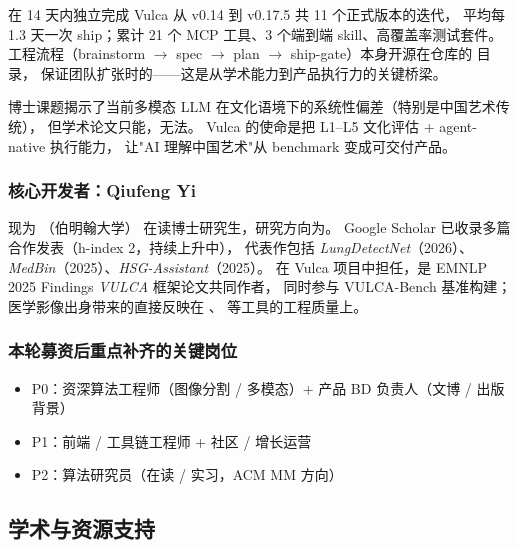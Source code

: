 \quad 在 14 天内独立完成 Vulca 从 v0.14 到 v0.17.5 共 11 个正式版本的迭代，
平均每 1.3 天一次 ship；累计 21 个 MCP 工具、3 个端到端 skill、高覆盖率测试套件。
工程流程（brainstorm $\to$ spec $\to$ plan $\to$ ship-gate）本身开源在仓库的  目录，
保证团队扩张时的——这是从学术能力到产品执行力的关键桥梁。

\quad 博士课题揭示了当前多模态 LLM 在文化语境下的系统性偏差（特别是中国艺术传统），
但学术论文只能，无法。
Vulca 的使命是把 L1–L5 文化评估 + agent-native 执行能力，
让"AI 理解中国艺术"从 benchmark 变成可交付产品。

\subsubsection*{核心开发者：Qiufeng Yi}

现为 （伯明翰大学）
在读博士研究生，研究方向为。
Google Scholar 已收录多篇合作发表（h-index 2，持续上升中），
代表作包括 \textit{LungDetectNet}（2026）、\textit{MedBin}（2025）、\textit{HSG-Assistant}（2025）。
在 Vulca 项目中担任，是 EMNLP 2025 Findings \textit{VULCA} 框架论文共同作者，
同时参与 VULCA-Bench 基准构建；医学影像出身带来的直接反映在
、 等工具的工程质量上。

\subsubsection*{本轮募资后重点补齐的关键岗位}

\begin{itemize}
  \item P0：资深算法工程师（图像分割 / 多模态）+ 产品 BD 负责人（文博 / 出版背景）
  \item P1：前端 / 工具链工程师 + 社区 / 增长运营
  \item P2：算法研究员（在读 / 实习，ACM MM 方向）
\end{itemize}


\subsection{学术与资源支持}

